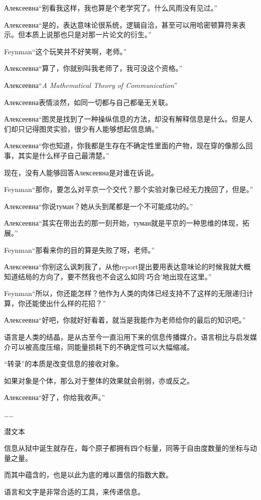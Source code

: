 \documentclass{article}
\begin{document}
Алексеевна“别看我这样，我也算是个老学究了。什么风雨没有见过。”

Алексеевна“是的，表达意味论很系统，逻辑自洽，甚至可以用哈密顿算符来表示。但本质上说那也只是对那一片论文的衍生。”

Feynman“这个玩笑并不好笑啊，老师。”

Алексеевна“算了，你就别叫我老师了，我可没这个资格。”

Алексеевна“\textit{A Mathematical Theory of Communication}”

Алексеевна表情淡然，如同一切都与自己都毫无关联。

Алексеевна“图灵是找到了一种操纵信息的方法，却没有解释信息是什么。但是人们却只记得图灵实验，很少有人能够想起信息熵。”

Алексеевна“你也知道，你我都是生存在不确定性里面的产物，现在穿的像那么回事，其实是什么样子自己最清楚。”

现在，没有人能够回答Алексеевна是对谁在诉说。

Feynman“那你，要怎么对平京一个交代？那个实验对象已经无力挽回了，但是。”

Алексеевна“你说туман？她从头到尾都是一个不可能成功的。”

Алексеевна“其实在带出去的那一刻开始，туман就是平京的一种思维的体现，拓展。”

Feynman“那看来你的目的算是失败了呀，老师。”

Алексеевна“你别这么讽刺我了，从他report提出要用表达意味论的时候我就大概知道结局的方向了，要不然我也不会这么如同‘巧合’地出现在这里。”

Feynman“所以，你还能怎样？他作为人类的肉体已经支持不了这样的无限递归计算，你还能使出什么样的花招？”

Алексеевна“好吧，你就好好看着，就当是我能作为老师给你的最后的知识吧。”

语言是人类的结晶，是从古至今一直沿用下来的信息传播媒介。语言相比与启发媒介可以被高度压缩，同能量损耗下的不确定性可以大幅缩减。

“转录”的本质是改变信息的接收对象。

如果对象是个体，那么对于整体的效果就会削弱，亦或反之。

Алексеевна“好了，你给我收声。”

……

潜文本

信息从狱中诞生就存在，每个原子都拥有四个标量，同等于自由度数量的坐标与动量之量。

而其中蕴含的，也是以此为底的难以置信的指数大数。

语言和文字是非常合适的工具，来传递信息。
\end{document}
